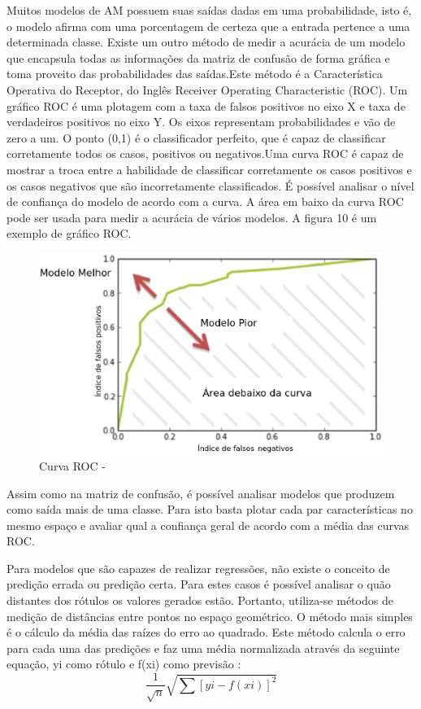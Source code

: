 Muitos modelos de AM possuem suas saídas dadas em uma probabilidade, isto é, o modelo afirma com uma porcentagem de certeza que a entrada pertence a uma determinada classe. Existe um outro método de medir a acurácia de um modelo que encapsula todas as informações da matriz de confusão de forma gráfica e toma proveito das probabilidades das saídas.Este método é a Característica Operativa do Receptor, do Inglês Receiver Operating Characteristic (ROC). Um gráfico ROC é uma plotagem com a taxa de falsos positivos no eixo X e taxa de verdadeiros positivos no eixo Y. Os eixos representam probabilidades e vão de zero a um. O ponto (0,1) é o classificador perfeito, que é capaz de classificar corretamente todos os casos, positivos ou negativos.Uma curva ROC é capaz de mostrar a troca entre a habilidade de classificar corretamente os casos positivos e os casos negativos que são incorretamente classificados. É possível  analisar o nível de confiança do modelo de acordo com a curva. A área em baixo da curva ROC pode ser usada para medir a acurácia de vários modelos. A figura 10 é um exemplo de gráfico ROC. 
  
\begin{figure}[!h]
\centering
\includegraphics[keepaspectratio=true,scale=0.70]
{figuras/roc.eps}
\caption{Curva ROC - \cite{howard2012b}}
\label{over}
\end{figure}


Assim como na matriz de confusão, é possível analisar modelos que produzem como saída mais de uma classe. Para isto basta plotar cada par características no mesmo espaço e avaliar qual a confiança geral de acordo com a média das curvas ROC.

Para modelos que são capazes de realizar regressões, não existe o conceito de predição errada ou predição certa. Para estes casos é possível analisar o quão distantes dos rótulos os valores gerados estão. Portanto, utiliza-se métodos de medição de distâncias entre pontos no espaço geométrico. O método mais simples é o cálculo da média das raízes do erro ao quadrado. Este método calcula o erro para cada uma das predições e faz uma média normalizada através da seguinte equação, yi como rótulo e f(xi) como previsão \cite{real2013}: 
\begin{equation}
       \frac{1}{\sqrt{n}}\sqrt{\sum \left [ y{i} - f\left ( x{i} \right )\right ]^{2} }
\end{equation}
  
